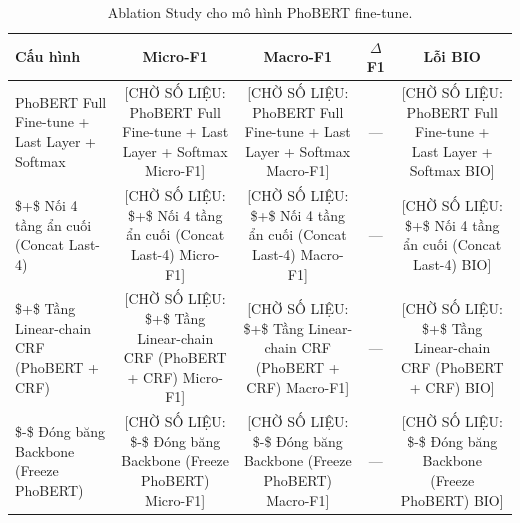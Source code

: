 \begin{table}[t]
\centering
\small
\begin{tabular}{lcccc}
\hline
\textbf{Cấu hình} & \textbf{Micro-F1} & \textbf{Macro-F1} & \textbf{$\Delta$F1} & \textbf{Lỗi BIO} \\
\hline
PhoBERT Full Fine-tune + Last Layer + Softmax & [CHỜ SỐ LIỆU: PhoBERT Full Fine-tune + Last Layer + Softmax Micro-F1] & [CHỜ SỐ LIỆU: PhoBERT Full Fine-tune + Last Layer + Softmax Macro-F1] & — & [CHỜ SỐ LIỆU: PhoBERT Full Fine-tune + Last Layer + Softmax BIO] \\
  \$+\$ Nối 4 tầng ẩn cuối (Concat Last-4) & [CHỜ SỐ LIỆU:   \$+\$ Nối 4 tầng ẩn cuối (Concat Last-4) Micro-F1] & [CHỜ SỐ LIỆU:   \$+\$ Nối 4 tầng ẩn cuối (Concat Last-4) Macro-F1] & — & [CHỜ SỐ LIỆU:   \$+\$ Nối 4 tầng ẩn cuối (Concat Last-4) BIO] \\
  \$+\$ Tầng Linear-chain CRF (PhoBERT + CRF) & [CHỜ SỐ LIỆU:   \$+\$ Tầng Linear-chain CRF (PhoBERT + CRF) Micro-F1] & [CHỜ SỐ LIỆU:   \$+\$ Tầng Linear-chain CRF (PhoBERT + CRF) Macro-F1] & — & [CHỜ SỐ LIỆU:   \$+\$ Tầng Linear-chain CRF (PhoBERT + CRF) BIO] \\
  \$-\$ Đóng băng Backbone (Freeze PhoBERT) & [CHỜ SỐ LIỆU:   \$-\$ Đóng băng Backbone (Freeze PhoBERT) Micro-F1] & [CHỜ SỐ LIỆU:   \$-\$ Đóng băng Backbone (Freeze PhoBERT) Macro-F1] & — & [CHỜ SỐ LIỆU:   \$-\$ Đóng băng Backbone (Freeze PhoBERT) BIO] \\
\hline
\end{tabular}
\caption{Ablation Study cho mô hình PhoBERT fine-tune.}
\label{tab:ablation_phobert}
\end{table}
